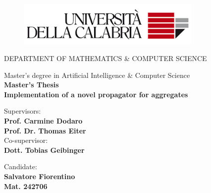 \documentclass[a4paper,12pt,oneside]{book}
\theoremstyle{definition}
\begin{document}
\begin{titlepage}
    \begin{center}
    \vspace*{0.2cm}
    \begin{figure}[H]
        \centering
        \includegraphics[width=0.8\textwidth]{imgs/logo.png}
    \end{figure}
        \vspace{5mm}
    	\uppercase{\normalsize Department of Mathematics \& Computer Science}\\
    \end{center}
    \begin{center}
    	\large{ Master's degree in Artificial Intelligence \& Computer Science}\\
        \vspace{3mm}
        \large{\bf Master's Thesis}\\
    	\vspace{10mm}
    {\LARGE{\bf Implementation of a novel propagator for aggregates}}\\	
     \vspace{7mm}
    \end{center}
    
    \vspace{25mm}
    \noindent
    \begin{minipage}[t]{0.47\textwidth}
    	{\large{ Supervisors:\vspace*{0.22cm}\\\bf Prof. Carmine Dodaro \\ 
        \bf Prof. Dr. Thomas Eiter\\}}
    	{\large{ Co-supervisor:\vspace*{0.22cm}\\\bf Dott. Tobias Geibinger }}
    	\vspace{12mm}
    \end{minipage}
    \hfill
    \begin{minipage}[t]{0.4\textwidth}\raggedleft
    	{\large{Candidate: \\ \bf Salvatore Fiorentino\\ Mat. 242706}}
    \end{minipage}
    
    \vspace{30mm}
    

\end{titlepage}
\end{document}
